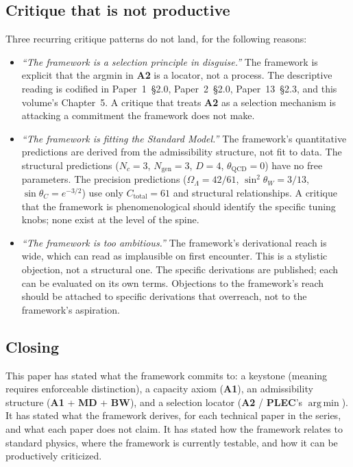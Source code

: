 \documentclass[11pt]{article}
\newcommand{\Aone}{\textbf{A1}}
\newcommand{\PLEC}{\textbf{PLEC}}
\newcommand{\argmin}{\mathop{\mathrm{arg\,min}}}
\begin{document}
\subsection{Critique that is not productive}\label{sec:unproductive_critique}

Three recurring critique patterns do not land, for the following reasons:

\begin{itemize}
    \item \emph{``The framework is a selection principle in disguise.''} The framework is explicit that the argmin in \textbf{A2} is a locator, not a process. The descriptive reading is codified in Paper~1~\S2.0, Paper~2~\S2.0, Paper~13~\S2.3, and this volume's Chapter~5. A critique that treats \textbf{A2} as a selection mechanism is attacking a commitment the framework does not make.
    \item \emph{``The framework is fitting the Standard Model.''} The framework's quantitative predictions are derived from the admissibility structure, not fit to data. The structural predictions ($N_c = 3$, $N_{\mathrm{gen}} = 3$, $D = 4$, $\theta_{\mathrm{QCD}} = 0$) have no free parameters. The precision predictions ($\Omega_\Lambda = 42/61$, $\sin^2\theta_W = 3/13$, $\sin\theta_C = e^{-3/2}$) use only $C_{\mathrm{total}} = 61$ and structural relationships. A critique that the framework is phenomenological should identify the specific tuning knobs; none exist at the level of the spine.
    \item \emph{``The framework is too ambitious.''} The framework's derivational reach is wide, which can read as implausible on first encounter. This is a stylistic objection, not a structural one. The specific derivations are published; each can be evaluated on its own terms. Objections to the framework's reach should be attached to specific derivations that overreach, not to the framework's aspiration.
\end{itemize}

\subsection{Closing}\label{sec:closing}

This paper has stated what the framework commits to: a keystone (meaning requires enforceable distinction), a capacity axiom (\Aone{}), an admissibility structure (\Aone{} + \textbf{MD} + \textbf{BW}), and a selection locator (\textbf{A2} / \PLEC{}'s $\argmin$). It has stated what the framework derives, for each technical paper in the series, and what each paper does not claim. It has stated how the framework relates to standard physics, where the framework is currently testable, and how it can be productively criticized.
\end{document}
